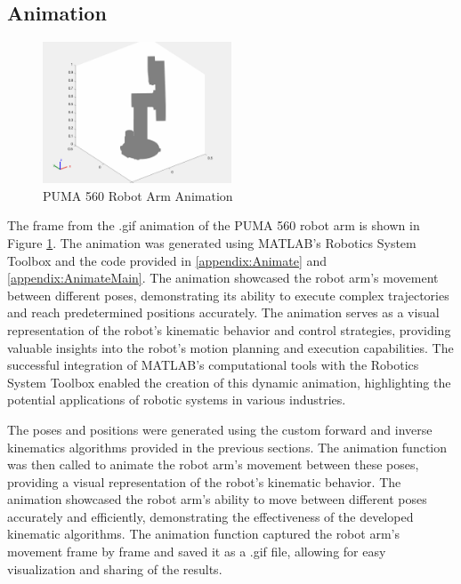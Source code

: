 \documentclass[conference]{IEEEtran}
\begin{document}
\subsection{Animation}
\begin{figure}[H]
    \centering
    \includegraphics[width=0.5\textwidth]{robot_animation-26 (dragged).png}
    \caption{PUMA 560 Robot Arm Animation}
    \label{fig:Animation}
\end{figure}

The frame from the .gif animation of the PUMA 560 robot arm is shown in Figure \ref{fig:Animation}. The animation was generated using MATLAB's Robotics System Toolbox and the code provided in \ref{appendix:Animate} and \ref{appendix:AnimateMain}. The animation showcased the robot arm's movement between different poses, demonstrating its ability to execute complex trajectories and reach predetermined positions accurately. The animation serves as a visual representation of the robot's kinematic behavior and control strategies, providing valuable insights into the robot's motion planning and execution capabilities. The successful integration of MATLAB's computational tools with the Robotics System Toolbox enabled the creation of this dynamic animation, highlighting the potential applications of robotic systems in various industries.

The poses and positions were generated using the custom forward and inverse kinematics algorithms provided in the previous sections. The animation function was then called to animate the robot arm's movement between these poses, providing a visual representation of the robot's kinematic behavior. The animation showcased the robot arm's ability to move between different poses accurately and efficiently, demonstrating the effectiveness of the developed kinematic algorithms. The animation function captured the robot arm's movement frame by frame and saved it as a .gif file, allowing for easy visualization and sharing of the results.
\end{document}
